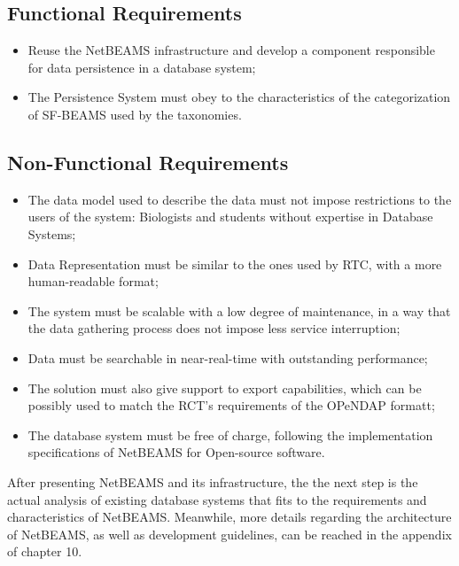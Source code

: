 \subsection{Functional Requirements}

\begin{itemize}
  \item Reuse the NetBEAMS infrastructure and develop a component responsible
  for data persistence in a database system;
  \item The Persistence System must obey to the characteristics of the
  categorization of SF-BEAMS used by the taxonomies.
\end{itemize}

\subsection{Non-Functional Requirements}

\begin{itemize}
  \item The data model used to describe the data must not impose restrictions
  to the users of the system: Biologists and students without expertise in
  Database Systems;
  \item Data Representation must be similar to the ones used by RTC, with a
  more human-readable format;
  \item The system must be scalable with a low degree of maintenance, in a
  way that the data gathering process does not impose less service interruption;
  \item Data must be searchable in near-real-time with outstanding performance;
  \item The solution must also give support to export capabilities, which can
  be possibly used to match the RCT's requirements of the OPeNDAP formatt;
  \item The database system must be free of charge, following the
  implementation specifications of NetBEAMS for Open-source software.
\end{itemize}

After presenting NetBEAMS and its infrastructure, the the next step is the
actual analysis of existing database systems that fits to the requirements
and characteristics of NetBEAMS. Meanwhile, more details regarding the
architecture of NetBEAMS, as well as development guidelines, can be reached in
the appendix of chapter 10.
